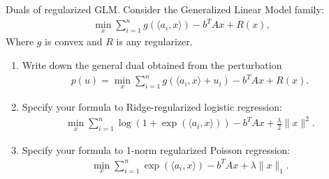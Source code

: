 \documentclass[10pt]{article}
\begin{document}
\begin{solution}[Solution]
\begin{enumerate}[label=(\alph*)]
\end{enumerate}


\end{solution}


\begin{problem}[Problem 4]
Duals of regularized GLM. Consider the Generalized Linear Model family: 
\begin{align*}
    \min_{x} \sum_{i=1}^n g(\langle a_i, x\rangle) - b^TAx + R(x),
\end{align*}
Where \( g \) is convex and \( R \) is any regularizer. 
\begin{enumerate}[label=(\alph*),nolistsep]
\item Write down the general dual obtained from the perturbation 
\begin{align*}
    p(u) = \min_{x} \sum_{i=1}^n g(\langle a_i, x\rangle + u_i) - b^TAx + R(x).
\end{align*}
\item Specify your formula to Ridge-regularized logistic regression: 
\begin{align*}
    \min_x \sum_{i=1}^n \log(1+\exp(\langle a_i, x \rangle))  - b^TAx  + \frac{\lambda}{2}\|x\|^2. 
\end{align*}
\item Specify your formula to 1-norm regularized Poisson regression: 
\begin{align*}
    \min_x \sum_{i=1}^n \exp(\langle a_i, x \rangle) - b^TAx +  \lambda\|x\|_1. 
\end{align*}
\end{enumerate}
\end{problem}
\end{document}
